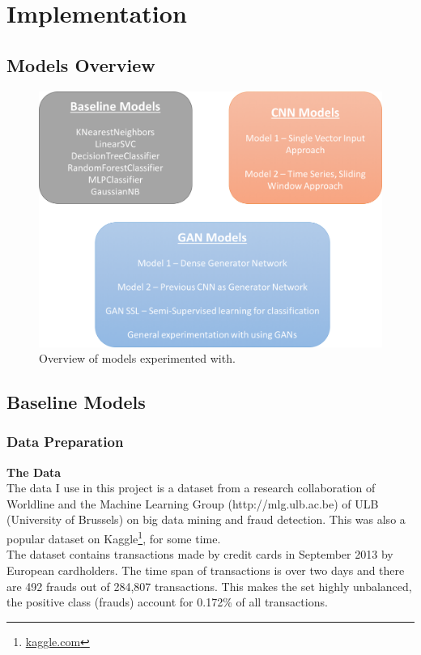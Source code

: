 \documentclass[12pt,a4paper,twoside]{report}
\begin{document}
\chapter{Implementation}
\section{Models Overview}

\begin{figure}[H]
\centering
\includegraphics[scale=0.8]{models_overview_2}
\caption{Overview of models experimented with.}
\label{fig:models_overview}
\end{figure}

\section{Baseline Models}
\subsection{Data Preparation}

\textbf{The Data}\\

The data I use in this project is a dataset from a research collaboration of Worldline and the Machine Learning Group (http://mlg.ulb.ac.be) of ULB (University of Brussels) on big data mining and fraud detection. This was also a popular dataset on Kaggle\footnote{\href{kaggle.com}{kaggle.com}}, for some time.\\
The dataset contains transactions made by credit cards in September 2013 by European cardholders. The time span of transactions is over two days and there are 492 frauds out of 284,807 transactions. This makes the set highly unbalanced, the positive class (frauds) account for 0.172\% of all transactions.
 
\end{document}

